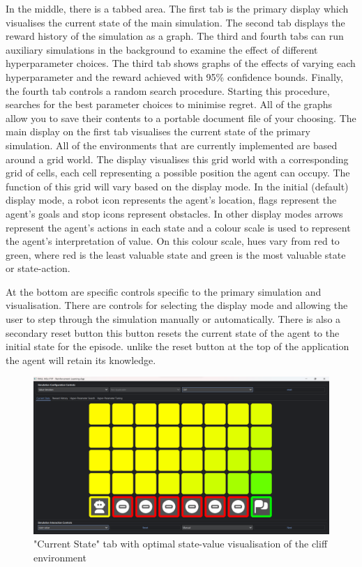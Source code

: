 \documentclass[]{final_report}
\begin{document}
In the middle, there is a tabbed area. The first tab is the primary display which visualises the current state of the main simulation. The second tab displays the reward history of the simulation as a graph. The third and fourth tabs can run auxiliary simulations in the background to examine the effect of different hyperparameter choices. The third tab shows graphs of the effects of varying each hyperparameter and the reward achieved with 95\% confidence bounds. Finally, the fourth tab controls a random search procedure. Starting this procedure, searches for the best parameter choices to minimise regret. All of the graphs allow you to save their contents to a portable document file of your choosing. 
\newpage
The main display on the first tab visualises the current state of the primary simulation. All of the environments that are currently implemented are based around a grid world. The display visualises this grid world with a corresponding grid of cells, each cell representing a possible position the agent can occupy. The function of this grid will vary based on the display mode. In the initial (default) display mode, a robot icon represents the agent's location, flags represent the agent's goals and stop icons represent obstacles. In other display modes arrows represent the agent's actions in each state and a colour scale is used to represent the agent's interpretation of value. On this colour scale, hues vary from red to green, where red is the least valuable state and green is the most valuable state or state-action.

At the bottom are specific controls specific to the primary simulation and visualisation. There are controls for selecting the display mode and allowing the user to step through the simulation manually or automatically. There is also a secondary reset button this button resets the current state of the agent to the initial state for the episode. unlike the reset button at the top of the application the agent will retain its knowledge.


\begin{figure}[H]
  \centering
  
  \includegraphics[trim={0 0 0 6mm},clip,width=\textwidth]{ui-screenshots/state-value-2.png}
  
  \caption{\label{fig:screenshot:current-state} "Current State" tab with optimal state-value visualisation of the cliff environment}
\end{figure}
\end{document}
